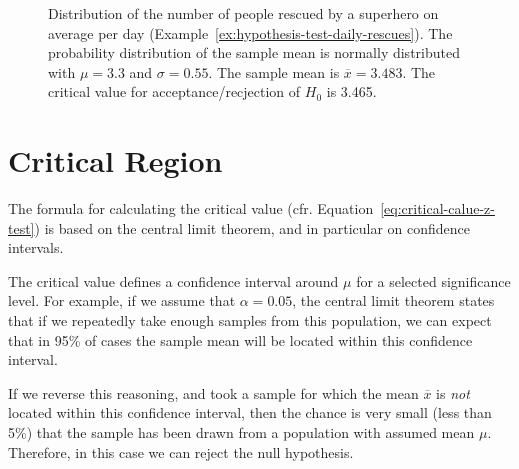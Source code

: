 \begin{figure}
  \centering
  \caption{Distribution of the number of people rescued by a superhero on average per day (Example~\ref{ex:hypothesis-test-daily-rescues}). The probability distribution of the sample mean is normally distributed with $\mu = 3.3$ and $\sigma = 0.55$. The sample mean is $\overline{x} = 3.483$. The critical value for acceptance/recjection of $H_{0}$ is 3.465.}
  \label{fig:hypothesis-test-daily-rescues}
\end{figure}

\section{Critical Region}
\label{sec:critical-region}

The formula for calculating the critical value (cfr. Equation~\ref{eq:critical-calue-z-test}) is based on the central limit theorem, and in particular on confidence intervals.

The critical value defines a confidence interval around $\mu$ for a selected significance level. For example, if we assume that $\alpha = 0.05$, the central limit theorem states that if we repeatedly take enough samples from this population, we can expect that in 95\% of cases the sample mean will be located within this confidence interval.

If we reverse this reasoning, and took a sample for which the mean $\overline{x}$ is \emph{not} located within this confidence interval, then the chance is very small (less than 5\%) that the sample has been drawn from a population with assumed mean $\mu$. Therefore, in this case we can reject the null hypothesis.

